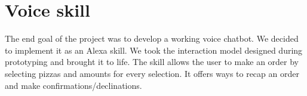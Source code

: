 \section{Voice skill}
The end goal of the project was to develop a working voice chatbot.
We decided to implement it as an Alexa skill. We took the interaction
model designed during prototyping and brought it to life. The skill
allows the user to make an order by selecting pizzas and amounts for
every selection. It offers ways to recap an order and make
confirmations/declinations.
